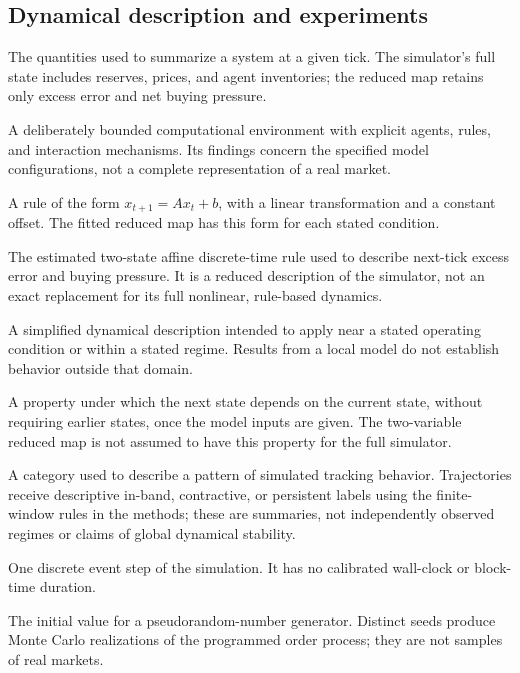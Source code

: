 \subsection*{Dynamical description and experiments}
\begin{description}[style=unboxed,leftmargin=0pt,labelwidth=0pt,labelsep=0.5em,itemsep=0.1em]
  \item[State:] The quantities used to summarize a system at a given tick. The simulator's full state includes reserves, prices, and agent inventories; the reduced map retains only excess error and net buying pressure.
  \item[Micro-world:] A deliberately bounded computational environment with explicit agents, rules, and interaction mechanisms. Its findings concern the specified model configurations, not a complete representation of a real market.
  \item[Affine map:] A rule of the form $x_{t+1}=Ax_t+b$, with a linear transformation and a constant offset. The fitted reduced map has this form for each stated condition.
  \item[Reduced map:] The estimated two-state affine discrete-time rule used to describe next-tick excess error and buying pressure. It is a reduced description of the simulator, not an exact replacement for its full nonlinear, rule-based dynamics.
  \item[Local model / linearization:] A simplified dynamical description intended to apply near a stated operating condition or within a stated regime. Results from a local model do not establish behavior outside that domain.
  \item[Markov property:] A property under which the next state depends on the current state, without requiring earlier states, once the model inputs are given. The two-variable reduced map is not assumed to have this property for the full simulator.
  \item[Regime:] A category used to describe a pattern of simulated tracking behavior. Trajectories receive descriptive in-band, contractive, or persistent labels using the finite-window rules in the methods; these are summaries, not independently observed regimes or claims of global dynamical stability.
  \item[Tick:] One discrete event step of the simulation. It has no calibrated wall-clock or block-time duration.
  \item[Seed:] The initial value for a pseudorandom-number generator. Distinct seeds produce Monte Carlo realizations of the programmed order process; they are not samples of real markets.

\end{description}
